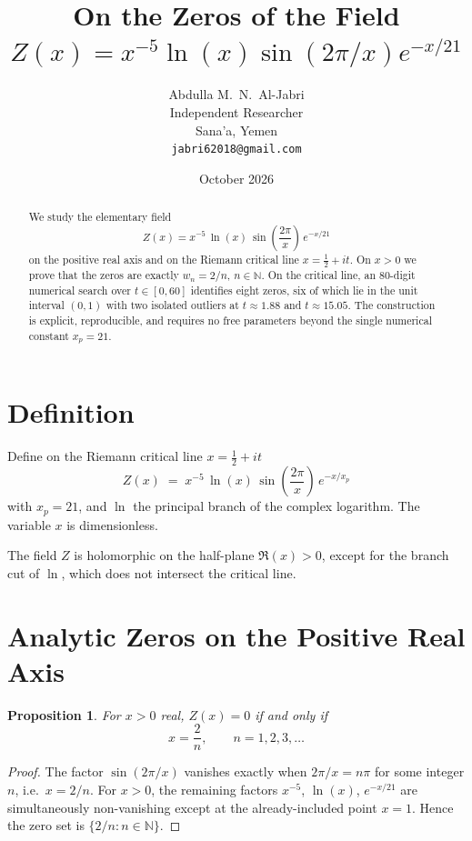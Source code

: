 \documentclass[11pt,a4paper]{article}
\title{\textbf{On the Zeros of the Field}\\[0.3em]
$Z(x)=x^{-5}\ln(x)\sin(2\pi/x)e^{-x/21}$}
\author{Abdulla M.~N.~Al-Jabri\\
\small Independent Researcher\\
\small Sana'a, Yemen\\
\small \texttt{jabri62018@gmail.com}}
\date{October 2026}
\newtheorem{proposition}{Proposition}
\begin{document}
\maketitle
\thispagestyle{fancy}

\begin{abstract}
We study the elementary field
\[
Z(x) = x^{-5}\,\ln(x)\,\sin\!\left(\frac{2\pi}{x}\right)\,e^{-x/21}
\]
on the positive real axis and on the Riemann critical line
$x=\tfrac{1}{2}+it$. On $x>0$ we prove that the zeros are exactly
$w_n = 2/n$, $n\in\mathbb{N}$. On the critical line, an 80-digit
numerical search over $t\in[0,60]$ identifies eight zeros, six of
which lie in the unit interval $(0,1)$ with two isolated outliers
at $t\approx 1.88$ and $t\approx 15.05$. The construction is explicit,
reproducible, and requires no free parameters beyond the single
numerical constant $x_p = 21$.
\end{abstract}

\section{Definition}

Define on the Riemann critical line $x = \tfrac{1}{2} + it$
\begin{equation}
\boxed{\;
Z(x) \;=\; x^{-5}\,\ln(x)\,\sin\!\left(\frac{2\pi}{x}\right)\,e^{-x/x_p}
\;}
\label{eq:Zdef}
\end{equation}
with $x_p = 21$, and $\ln$ the principal branch of the complex
logarithm. The variable $x$ is dimensionless.

The field $Z$ is holomorphic on the half-plane $\Re(x)>0$, except
for the branch cut of $\ln$, which does not intersect the critical
line.

\section{Analytic Zeros on the Positive Real Axis}

\begin{proposition}\label{prop:real-zeros}
For $x>0$ real, $Z(x)=0$ if and only if
\[
x=\frac{2}{n},\qquad n=1,2,3,\dots
\]
\end{proposition}

\begin{proof}
The factor $\sin(2\pi/x)$ vanishes exactly when $2\pi/x = n\pi$
for some integer $n$, i.e.\ $x=2/n$. For $x>0$, the remaining
factors $x^{-5}$, $\ln(x)$, $e^{-x/21}$ are simultaneously
non-vanishing except at the already-included point $x=1$.
Hence the zero set is $\{2/n : n\in\mathbb{N}\}$.
\end{proof}
\end{document}
